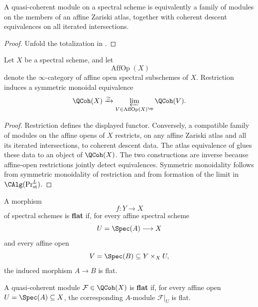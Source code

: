 \begin{corollary}
\label{cor:qcoh-zariski-locality}
A quasi-coherent module on a spectral scheme is equivalently a family of
modules on the members of an affine Zariski atlas, together with coherent
descent equivalences on all iterated intersections.
\end{corollary}

\begin{proof}
Unfold the totalization in .
\end{proof}

\begin{lemma}
\label{lem:qcoh-affine-open-basis}
Let $X$ be a spectral scheme, and let
\[
    \operatorname{AffOp}(X)
\]
denote the $\infty$-category of affine open spectral subschemes of $X$.
Restriction induces a symmetric monoidal equivalence
\[
    \QCoh(X)
    \xrightarrow{\simeq}
    \varprojlim_
    {V\in\operatorname{AffOp}(X)^{\op}}
    \QCoh(V).
\]
\end{lemma}

\begin{proof}
Restriction defines the displayed functor. Conversely, a compatible
family of modules on the affine opens of $X$ restricts, on any affine
Zariski atlas and all its iterated intersections, to coherent descent
data. The atlas equivalence of
 glues these data to an object of
$\QCoh(X)$. The two constructions are inverse because affine-open
restrictions jointly detect equivalences. Symmetric monoidality follows
from symmetric monoidality of restriction and from formation of the limit
in $\CAlg(\Pr^L_{\mathrm{st}})$.
\end{proof}

\begin{definition}
\label{def:flat-spectral-scheme-morphism}
A morphism
\[
    f
    \colon
    Y
    \longrightarrow
    X
\]
of spectral schemes is \textbf{flat} if, for every affine spectral scheme
\[
    U
    =
    \Spec(A)
    \longrightarrow
    X
\]
and every affine open
\[
    V
    =
    \Spec(B)
    \subseteq
    Y\times_XU,
\]
the induced morphism $A\to B$ is flat.

A quasi-coherent module $\mathcal F\in\QCoh(X)$ is \textbf{flat} if, for
every affine open $U=\Spec(A)\subseteq X$, the corresponding $A$-module
$\mathcal F|_U$ is flat.
\end{definition}

